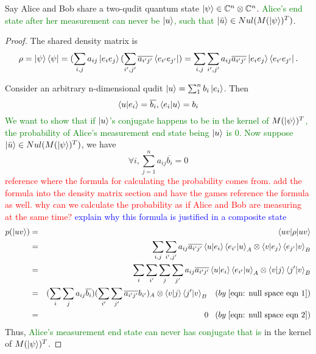 \begin{prop} \label{null space}
Say Alice and Bob share a two-qudit quantum state $\ket{\psi} \in \mathbb{C}^n \otimes \mathbb{C}^n$. \textcolor{green}{Alice's end state after her measurement can never be $\ket{u}$, such that} $\ket{\Bar{u}} \in Nul(M(\ket{\psi})^T)$.
\end{prop}
\begin{proof}
The shared density matrix is 
\begin{gather*}
\rho=\ket{\psi}\bra{\psi}=(\sum_{i,j} a_{ij}\ket{e_i e_j}(\sum_{i',j'} \overline{a_{i'j'}}\bra{e_{i'} e_{j'}})=\sum_{i,j} \sum_{i',j'} a_{ij} \overline{a_{i'j'}}\ket{e_i e_j}\bra{e_{i'} e_{j'}}.  
\end{gather*}

Consider an arbitrary n-dimensional qudit $\ket{u}=\sum_1^n b_i \ket{e_i}$. Then
\begin{equation} \label{eqn: null space eqn 1}
    \braket{u|e_i}=\overline{b_i}, \braket{e_i|u}=b_i
\end{equation}
\textcolor{green}{We want to show that if $\ket{u}$'s conjugate happens to be in the kernel of $M(\ket{\psi})^T$, the probability of Alice's measurement end state being $\ket{u}$ is 0. Now suppose}
$\ket{\Bar{u}} \in Nul(M(\ket{\psi})^T)$, we have \begin{equation} \label{eqn: null space eqn 2}
    \forall i, \sum_{j=1}^n a_{ij} \overline{b_i}=0
\end{equation}
\textcolor{red}{reference where the formula for calculating the probability comes from. add the formula into the density matrix section and have the games reference the formula as well. why can we calculate the probability as if Alice and Bob are measuring at the same time? }
\textcolor{blue}{explain why this formula is justified in a composite state}
\begin{eqnarray*}
p(\ket{uv})&=&\braket{u v | \rho |u v}\\
&=&\sum_{i,j} \sum_{i',j'} a_{ij} \overline{a_{i'j'}}\braket{u|e_i}\braket{e_{i'}|u}_A \otimes \braket{v|e_j}\braket{e_{j'}|v}_B\\
&=&\sum_i \sum_{i'} \sum_j \sum_{j'}  a_{ij} \overline{a_{i'j'}} \braket{u|e_i}\braket{e_{i'}|u}_A \otimes \braket{v|j}\braket{j'|v}_B\\
&=&(\sum_i \sum_j a_{ij} \overline{b_i})(\sum_{i'} \sum_{j'} \overline{a_{i'j'}} b_{i'})_A \otimes \braket{v|j}\braket{j'|v}_B   \; \; \;  (by \;  \eqref{eqn: null space eqn 1})\\ 
&=& 0 \; \; \; (by \; \eqref{eqn: null space eqn 2})
\end{eqnarray*}
Thus, \textcolor{green}{Alice's measurement end state can never has conjugate that is} in the kernel of $M(\ket{\psi})^T$.
\end{proof}

